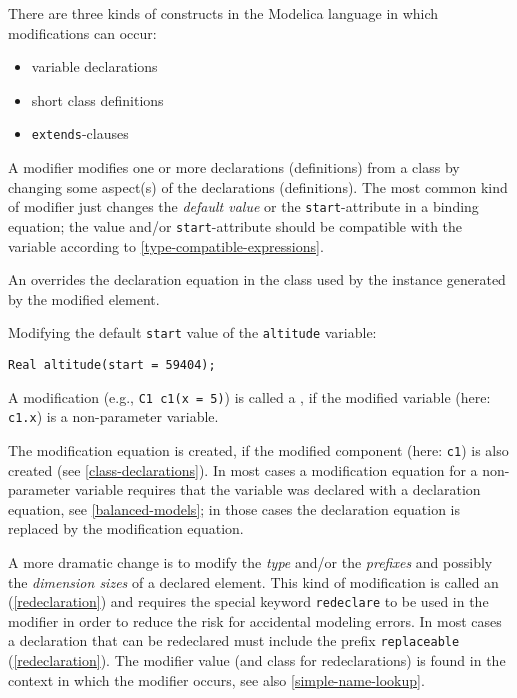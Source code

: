 There are three kinds of constructs in the Modelica language in which modifications can occur:
\begin{itemize}
\item
  variable declarations
\item
  short class definitions
\item
  \lstinline!extends!-clauses
\end{itemize}

A modifier modifies one or more declarations (definitions) from a class by changing some aspect(s) of the declarations (definitions).
The most common kind of modifier just changes the \emph{default value} or the \lstinline!start!-attribute in a binding equation; the value and/or \lstinline!start!-attribute should be compatible with the variable according to \cref{type-compatible-expressions}.

An  overrides the declaration equation in the class used by the instance generated by the modified element.

\begin{example}
Modifying the default \lstinline!start! value of the \lstinline!altitude! variable:
\begin{lstlisting}[language=modelica]
Real altitude(start = 59404);
\end{lstlisting}
\end{example}

A modification (e.g., \lstinline!C1 c1(x = 5)!) is called a , if the modified variable (here: \lstinline!c1.x!) is a non-parameter variable.

\begin{nonnormative}
The modification equation is created, if the modified component (here: \lstinline!c1!) is also created (see \cref{class-declarations}).
In most cases a modification equation for a non-parameter variable requires that the variable was declared with a declaration equation, see \cref{balanced-models}; in those cases the declaration equation is replaced by the modification equation.
\end{nonnormative}

A more dramatic change is to modify the \emph{type} and/or the \emph{prefixes} and possibly the \emph{dimension sizes} of a declared element.
This kind of modification is called an  (\cref{redeclaration}) and requires the special keyword \lstinline!redeclare! to be used in the modifier in order to reduce the risk for accidental modeling errors.
In most cases a declaration that can be redeclared must include the prefix \lstinline!replaceable! (\cref{redeclaration}).
The modifier value (and class for redeclarations) is found in the context in which the modifier occurs, see also \cref{simple-name-lookup}.

